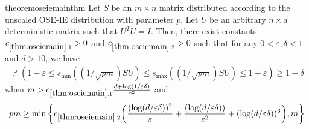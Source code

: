 \documentclass[11pt]{amsart}
\numberwithin{equation}{section}
\numberwithin{equation}{section}
\DeclareMathOperator{\Pb}{\mathbb{P}}
\DeclarePairedDelimiter{\paren}{(}{)}
\theoremstyle{remark}
\theoremstyle{definition}
\begin{document}
\begin{restatable}{theorem}{oseiemainthm} \label{thm:oseiemain}
   Let $S$ be an $m \times n$ matrix distributed according to the unscaled OSE-IE distribution with parameter $p$. Let $U$ be an arbitrary $n \times d$ deterministic matrix such that $U^TU=I$. Then, there exist constants $c_{\ref*{thm:oseiemain}.1}>0$ and $c_{\ref*{thm:oseiemain}.2}>0$ such that for any $0 < \varepsilon , \delta < 1$ and $d>10$,
we have
\begin{equation}
    \begin{aligned}
\Pb \left( 1 - \varepsilon  \leq s_{\min}((1/\sqrt{pm})SU)   \leq s_{\max}((1/\sqrt{pm})SU) \leq 1 + \varepsilon \right) \geq 1-\delta
\end{aligned}
\end{equation}
when $m > c_{\ref*{thm:oseiemain}.1}  \frac{d + \log(1/\varepsilon\delta)}{\varepsilon^2} $  and $$pm \geq \min \left\{ c_{\ref*{thm:oseiemain}.2}\paren*{\frac{(\log (d/\varepsilon\delta))^2}{\varepsilon}+\frac{(\log (d/\varepsilon\delta))}{\varepsilon^2} + (\log (d/\varepsilon\delta))^3 } ,m \right\}$$
\end{restatable}
\end{document}

